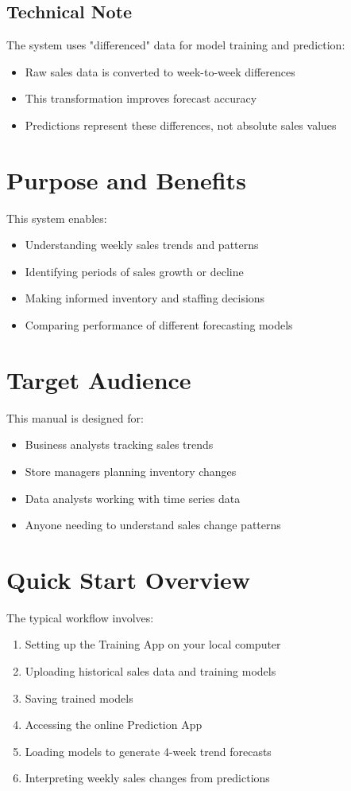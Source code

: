 \subsection{Technical Note}
The system uses "differenced" data for model training and prediction:
\begin{itemize}
	\item Raw sales data is converted to week-to-week differences
	\item This transformation improves forecast accuracy
	\item Predictions represent these differences, not absolute sales values
\end{itemize}

\section{Purpose and Benefits}

This system enables:
\begin{itemize}
	\item Understanding weekly sales trends and patterns
	\item Identifying periods of sales growth or decline
	\item Making informed inventory and staffing decisions
	\item Comparing performance of different forecasting models
\end{itemize}

\section{Target Audience}

This manual is designed for:
\begin{itemize}
	\item Business analysts tracking sales trends
	\item Store managers planning inventory changes
	\item Data analysts working with time series data
	\item Anyone needing to understand sales change patterns
\end{itemize}

\section{Quick Start Overview}

The typical workflow involves:
\begin{enumerate}
	\item Setting up the Training App on your local computer
	\item Uploading historical sales data and training models
	\item Saving trained models
	\item Accessing the online Prediction App
	\item Loading models to generate 4-week trend forecasts
	\item Interpreting weekly sales changes from predictions
\end{enumerate}

